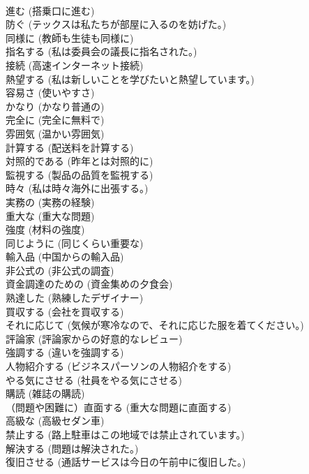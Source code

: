 \documentclass[8pt]{extreport}
\begin{document}
\begin{CJK}{UTF8}{min}
\\	進む	(搭乗口に進む)		
\\	防ぐ	(テックスは私たちが部屋に入るのを妨げた。)		
\\	同様に	(教師も生徒も同様に)		
\\	指名する	(私は委員会の議長に指名された。)		
\\	接続	(高速インターネット接続)		
\\	熱望する	(私は新しいことを学びたいと熱望しています。)		
\\	容易さ	(使いやすさ)		
\\	かなり	(かなり普通の)		
\\	完全に	(完全に無料で)		
\\	雰囲気	(温かい雰囲気)		
\\	計算する	(配送料を計算する)		
\\	対照的である	(昨年とは対照的に)		
\\	監視する	(製品の品質を監視する)		
\\	時々	(私は時々海外に出張する。)		
\\	実務の	(実務の経験)		
\\	重大な	(重大な問題)		
\\	強度	(材料の強度)		
\\	同じように	(同じくらい重要な)		
\\	輸入品	(中国からの輸入品)		
\\	非公式の	(非公式の調査)		
\\	資金調達のための	(資金集めの夕食会)		
\\	熟達した	(熟練したデザイナー)		
\\	買収する	(会社を買収する)		
\\	それに応じて	(気候が寒冷なので、それに応じた服を着てください。)		
\\	評論家	(評論家からの好意的なレビュー)		
\\	強調する	(違いを強調する)		
\\	人物紹介する	(ビジネスパーソンの人物紹介をする)		
\\	やる気にさせる	(社員をやる気にさせる)		
\\	購読	(雑誌の購読)		
\\	（問題や困難に）直面する	(重大な問題に直面する)		
\\	高級な	(高級セダン車)		
\\	禁止する	(路上駐車はこの地域では禁止されています。)		
\\	解決する	(問題は解決された。)		
\\	復旧させる	(通話サービスは今日の午前中に復旧した。)		

\end{CJK}
\end{document}

